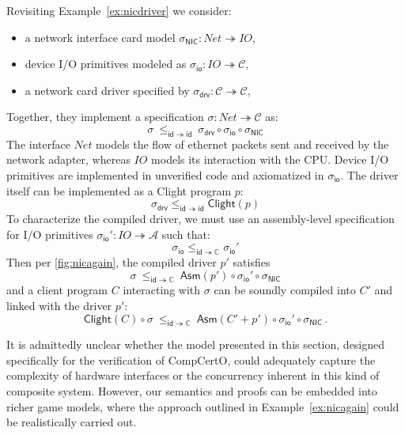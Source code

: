 \documentclass[sigplan,screen]{acmart}
\newcommand{\kw}[1]{\ensuremath{ \mathsf{#1} }}
\newcommand{\li}[1]{\mathit{#1}}
\begin{document}
\begin{example} \label{ex:nicagain} %
  Revisiting Example~\ref{ex:nicdriver}
  we consider:
  \begin{itemize}
  \item a network interface card model
  $\sigma_\kw{NIC} : \li{Net} \twoheadrightarrow \li{IO}$,
  \item device I/O primitives modeled as
  $\sigma_\kw{io} : \li{IO} \twoheadrightarrow \mathcal{C}$,
  \item a network card driver specified by
  $\sigma_\kw{drv} : \mathcal{C} \twoheadrightarrow \mathcal{C}$,
  \end{itemize}
  Together, they implement a specification
  $\sigma : \li{Net} \twoheadrightarrow \mathcal{C}$ as:
  \begin{equation} \label{eqn:nicspec}
    \sigma
    \: \le_{\kw{id} \twoheadrightarrow \kw{id}} \:
    \sigma_\kw{drv} \circ \sigma_\kw{io} \circ \sigma_\kw{NIC}
  \end{equation}
  The interface $\li{Net}$ models the flow of ethernet packets
  sent and received by the network adapter,
  whereas $\li{IO}$ models its interaction with the CPU.
  Device I/O primitives are implemented in unverified code
  and axiomatized in $\sigma_\kw{io}$.
  The driver itself can be implemented as a Clight program $p$:
  \begin{equation} \label{eqn:drvcorrect}
    \sigma_\kw{drv}
    \le_{\kw{id} \twoheadrightarrow \kw{id}}
    \kw{Clight}(p)
  \end{equation}
  To characterize the compiled driver,
  we must use an assembly-level specification for I/O primitives
  $\sigma_\kw{io}' : \li{IO} \twoheadrightarrow \mathcal{A}$
  such that:
  \begin{equation} \label{eqn:iocompat}
    \sigma_\kw{io}
    \le_{\kw{id} \twoheadrightarrow \mathbb{C}}
    \sigma_\kw{io}'
  \end{equation}
  Then per \autoref{fig:nicagain},
  the compiled driver $p'$ satisfies
  \[
    \sigma
    \: \le_{\kw{id} \twoheadrightarrow \mathbb{C}} \:
    \kw{Asm}(p') \circ \sigma_\kw{io}' \circ \sigma_\kw{NIC}
  \]
  and a client program $C$ interacting with $\sigma$
  can be soundly compiled into $C'$ and linked with the driver $p'$:
  \[
    \kw{Clight}(C) \circ \sigma
    \: \le_{\kw{id} \twoheadrightarrow \mathbb{C}} \:
    \kw{Asm}(C' + p') \circ \sigma_\kw{io}' \circ \sigma_\kw{NIC}
    \,.
  \]
\end{example}

It is admittedly unclear whether
the model presented in this section,
designed specifically for the verification of CompCertO,
could adequately capture
the complexity of hardware interfaces
or the concurrency inherent in this kind of composite system.
However,
our semantics and proofs
can be embedded into richer game models,
where the approach outlined in Example~\ref{ex:nicagain}
could be realistically carried out.
\end{document}
